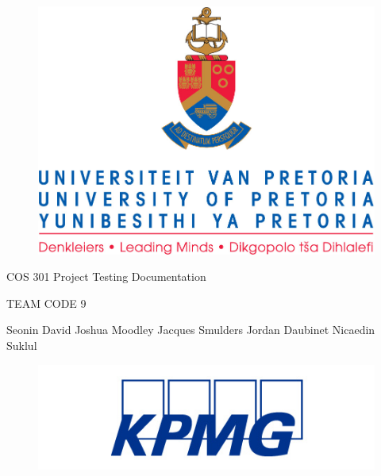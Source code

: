 \documentclass[]{article}
\begin{document}
\selectfont
    \begin{center}\thispagestyle{empty}
    	\begin{figure}[h]
			\centering
			\includegraphics[width=0.60\linewidth]{Graphics/uplogo.jpg}
	 	\end{figure}
    
        \newline
        {\Huge{} COS 301 Project \linebreak
        Testing Documentation \linebreak 
        \par}
        
        {\Huge{}\selectfont
        TEAM CODE 9
        \linebreak
        \par}
        
        \begin{LARGE}\selectfont
            Seonin David
            \linebreak
            \linebreak
            Joshua Moodley
            \linebreak
            \linebreak
            Jacques Smulders
            \linebreak
            \linebreak
            Jordan Daubinet
            \linebreak
            \linebreak
            Nicaedin Suklul
        \end{LARGE}
    \end{center}
    
    \begin{figure}[b]
			\centering
			\includegraphics[width=0.3\linewidth]{Graphics/kpmgLogo.jpg}
	\end{figure}  
    
\end{document}
